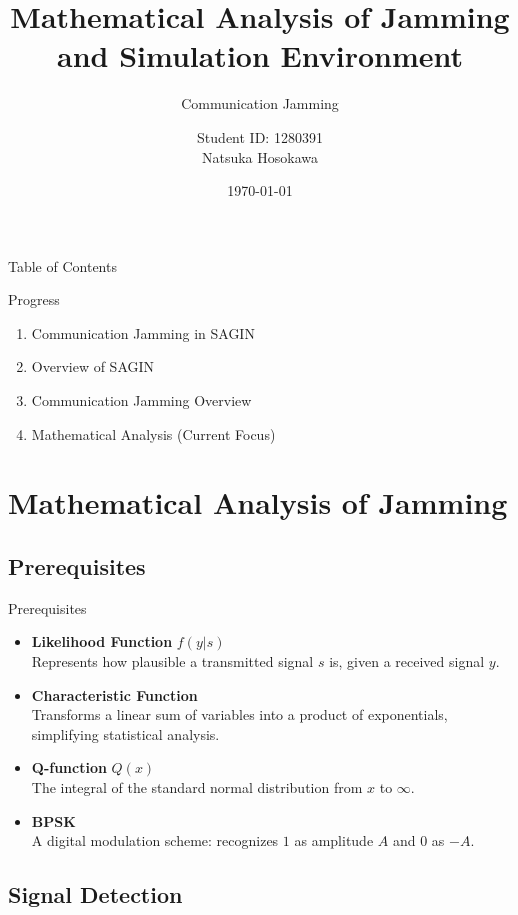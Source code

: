 \documentclass[11pt, aspectratio=169]{beamer}
\title{Mathematical Analysis of Jamming and Simulation Environment}
\subtitle{Communication Jamming}
\author{Student ID: 1280391 \\ Natsuka Hosokawa}
\institute{Kochi University of Technology}
\date{\today}
\begin{document}
\begin{frame}
  \titlepage
\end{frame}

\begin{frame}{Table of Contents}
  \tableofcontents
\end{frame}


\begin{frame}{Progress}
  \begin{enumerate}
    \item Communication Jamming in SAGIN
    \item Overview of SAGIN
    \item Communication Jamming Overview
    \item Mathematical Analysis (Current Focus)
  \end{enumerate}
\end{frame}

\section{Mathematical Analysis of Jamming}
\subsection{Prerequisites}

\begin{frame}{Prerequisites}
  \begin{itemize}
    \item \textbf{Likelihood Function} $f(y|s)$ \\
      Represents how plausible a transmitted signal $s$ is, given a received signal $y$.
    \item \textbf{Characteristic Function} \\
      Transforms a linear sum of variables into a product of exponentials, simplifying statistical analysis.
    \item \textbf{Q-function} $Q(x)$ \\
      The integral of the standard normal distribution from $x$ to $\infty$.
    \item \textbf{BPSK} \\
      A digital modulation scheme: recognizes $1$ as amplitude $A$ and $0$ as $-A$.
  \end{itemize}
\end{frame}

\subsection{Signal Detection}
\end{document}
